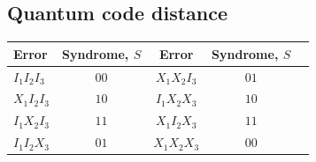 \documentclass[]{arxiv}
\theoremstyle{plain}%
\theoremstyle{definition}
\theoremstyle{remark}
\begin{document}
\subsection{Quantum code distance}

\begin{table}
	\def\arraystretch{1.3}
	{\begin{tabular}{lc|ccc} \toprule
			Error & Syndrome, $S$ & Error & Syndrome, $S$\\\midrule
			$I_1I_2I_3$ & $00$ & $X_1X_2I_3$ & $01$\\
			$X_1I_2I_3$ & $10$ & $I_1X_2X_3$ & $10$\\
			$I_1 X_2I_3$ & $11$ & $X_1I_2X_3$ & $11$\\
			$I_1 I_2 X_3$ & $01$ & $X_1X_2X_3$ & $00$\\
			\bottomrule
	\end{tabular}}
	\label{tab:three_qubit}
\end{table}
\end{document}
